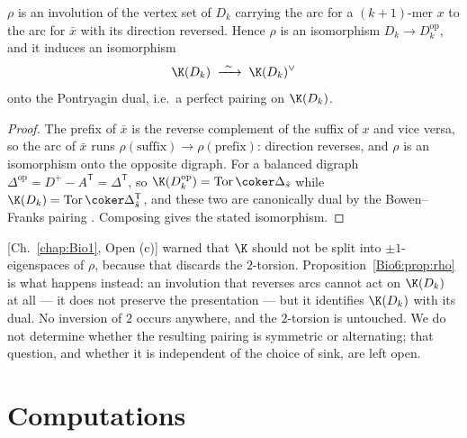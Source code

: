 \begin{proposition}\label{Bio6:prop:rho}
$\rho$ is an involution of the vertex set of $D_k$ carrying the arc for a $(k{+}1)$-mer
$x$ to the arc for $\bar x$ with its direction reversed. Hence $\rho$ is an isomorphism
$D_k\to D_k^{\mathrm{op}}$, and it induces an isomorphism
\[
\K(D_k)\;\xrightarrow{\ \sim\ }\;\K(D_k)^{\vee}
\]
onto the Pontryagin dual, i.e.\ a perfect pairing on $\K(D_k)$.
\end{proposition}

\begin{proof}
The prefix of $\bar x$ is the reverse complement of the suffix of $x$ and vice versa, so
the arc of $\bar x$ runs $\rho(\text{suffix})\to\rho(\text{prefix})$: direction reverses,
and $\rho$ is an isomorphism onto the opposite digraph. For a balanced digraph
$\Delta^{\mathrm{op}}=D^{+}-A^{\mathsf T}=\Delta^{\mathsf T}$, so
$\K(D_k^{\mathrm{op}})=\operatorname{Tor}\coker\Delta_{\hat s}$ while
$\K(D_k)=\operatorname{Tor}\coker\Delta_{\hat s}^{\mathsf T}$, and these two are
canonically dual by the Bowen--Franks pairing \cite[Lem.~1.5]{ANCFT8}. Composing gives the
stated isomorphism.
\end{proof}

\begin{remark}\label{Bio6:rem:nosplit}
[Ch.~\ref{chap:Bio1}, Open (c)] warned that $\K$ should not be split into $\pm1$-eigenspaces of
$\rho$, because that discards the $2$-torsion. Proposition~\ref{Bio6:prop:rho} is what happens
instead: an involution that reverses arcs cannot act on $\K(D_k)$ at all --- it does not
preserve the presentation --- but it identifies $\K(D_k)$ with its dual. No inversion of
$2$ occurs anywhere, and the $2$-torsion is untouched. We do not determine whether the
resulting pairing is symmetric or alternating; that question, and whether it is
independent of the choice of sink, are left open.
\end{remark}

\section{Computations}\label{Bio6:sec:comp}

